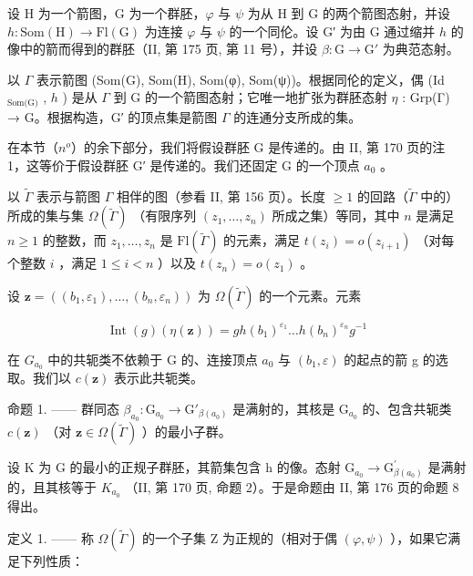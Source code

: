 设 H 为一个箭图，G 为一个群胚，\(\varphi\) 与 \(\psi\) 为从 H 到 G 的两个箭图态射，并设 \(h\colon \mathrm{Som}(\mathrm{H})\to \mathrm{Fl}(\mathrm{G})\) 为连接 \(\varphi\) 与 \(\psi\) 的一个同伦。设 G′ 为由 G 通过缩并 \(h\) 的像中的箭而得到的群胚（II, 第 175 页, 第 11 号），并设 \(\beta\colon\mathrm{G}\to\mathrm{G}'\) 为典范态射。

以 \(\Gamma\) 表示箭图 (Som(G), Som(H), Som(φ), Som(ψ))。根据同伦的定义，偶 (Id \(_{\text{Som(G)}}\) , \(h\) ) 是从 \(\Gamma\) 到 G 的一个箭图态射；它唯一地扩张为群胚态射 \(\eta\) : Grp(Γ) → G。根据构造，G′ 的顶点集是箭图 \(\Gamma\) 的连通分支所成的集。

在本节（\(n^{o}\)）的余下部分，我们将假设群胚 G 是传递的。由 II, 第 170 页的注 1，这等价于假设群胚 G′ 是传递的。我们还固定 G 的一个顶点 \(a_{0}\) 。

以 \(\widetilde{\Gamma}\) 表示与箭图 \(\Gamma\) 相伴的图（参看 II, 第 156 页）。长度 \(\geqslant 1\) 的回路（\(\widetilde{\Gamma}\) 中的）所成的集与集 \(\Omega(\widetilde{\Gamma})\) （有限序列 \((z_1, \ldots, z_n)\) 所成之集）等同，其中 \(n\) 是满足 \(n \geqslant 1\) 的整数，而 \(z_1, \ldots, z_n\) 是 \(\mathrm{Fl}(\widetilde{\Gamma})\) 的元素，满足 \(t(z_i) = o(z_{i+1})\) （对每个整数 \(i\) ，满足 \(1 \leqslant i < n\) ）以及 \(t(z_n) = o(z_1)\) 。

设 \(\mathbf{z} = ((b_{1}, \varepsilon_{1}), \ldots, (b_{n}, \varepsilon_{n}))\) 为 \(\Omega(\widetilde{\Gamma})\) 的一个元素。元素

\[
\operatorname{Int} (g) (\eta (\mathbf {z})) = g h (b _ {1}) ^ {\varepsilon_ {1}} \dots h (b _ {n}) ^ {\varepsilon_ {n}} g ^ {- 1}
\]

在 \(G_{a_{0}}\) 中的共轭类不依赖于 G 的、连接顶点 \(a_{0}\) 与 \((b_{1},\varepsilon)\) 的起点的箭 g 的选取。我们以 \(c(\mathbf{z})\) 表示此共轭类。

命题 1. —— 群同态 \(\beta_{a_0} \colon \mathrm{G}_{a_0} \to \mathrm{G}'_{\beta(a_0)}\) 是满射的，其核是 \(\mathrm{G}_{a_0}\) 的、包含共轭类 \(c(\mathbf{z})\) （对 \(\mathbf{z} \in \Omega(\widetilde{\Gamma})\) ）的最小子群。

设 K 为 G 的最小的正规子群胚，其箭集包含 h 的像。态射 \(\mathrm{G}_{a_{0}} \rightarrow \mathrm{G}^{\prime}_{\beta(a_{0})}\) 是满射的，且其核等于 \(K_{a_{0}}\) （II, 第 170 页, 命题 2）。于是命题由 II, 第 176 页的命题 8 得出。

定义 1. —— 称 \(\Omega(\widetilde{\Gamma})\) 的一个子集 Z 为正规的（相对于偶 \((\varphi, \psi)\) ），如果它满足下列性质：


